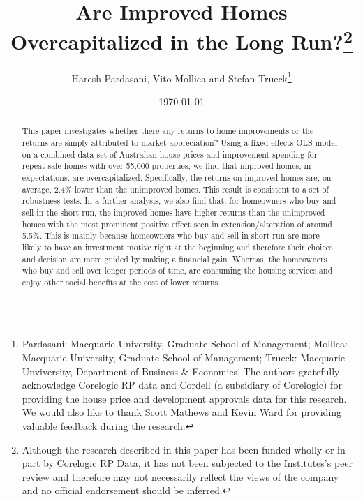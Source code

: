 \documentclass{article}
\begin{document}
\title{Are Improved Homes Overcapitalized in the Long Run?\footnote{Although the research described in this paper has been funded wholly or in part by Corelogic RP Data, it has not been subjected to the Institutes's peer review and therefore may not necessarily reflect the views of the company and no official endorsement should be inferred.}}
\author{Haresh Pardasani, Vito Mollica and Stefan Trueck\thanks{%
Pardasani: Macquarie University, Graduate School of Management; Mollica: Macquarie University, Graduate School of Management; Trueck: Macquarie Unviversity, Department of Business \& Economics. The authors gratefully acknowledge Corelogic RP data and Cordell (a subsidiary of Corelogic) for providing the house price and development approvals data for this research. We would also like to thank Scott Mathews and Kevin Ward for providing valuable feedback during the research.}}
\date{\today}

\maketitle{}

\begin{abstract}
This paper investigates whether there any returns to home improvements or the returns are simply attributed to market appreciation? Using a fixed effects OLS model on a combined data set of Australian house prices and improvement spending for repeat sale homes with over 55,000 properties, we find that improved homes, in expectations, are overcapitalized. Specifically, the returns on improved homes are, on average, 2.4\% lower than the unimproved homes. This result is consistent to a set of robustness tests. In a further analysis, we also find that, for homeowners who buy and sell in the short run, the improved homes have higher returns than the unimproved homes with the most prominent positive effect seen in extension/alteration of around 5.5\%. This is mainly because homeowners who buy and sell in short run are more likely to have an investment motive right at the beginning and therefore their choices and decision are more guided by making a financial gain. Whereas, the homeowners who buy and sell over longer periods of time, are consuming the housing services and enjoy other social benefits at the cost of lower returns.
\end{abstract}
\end{document}
